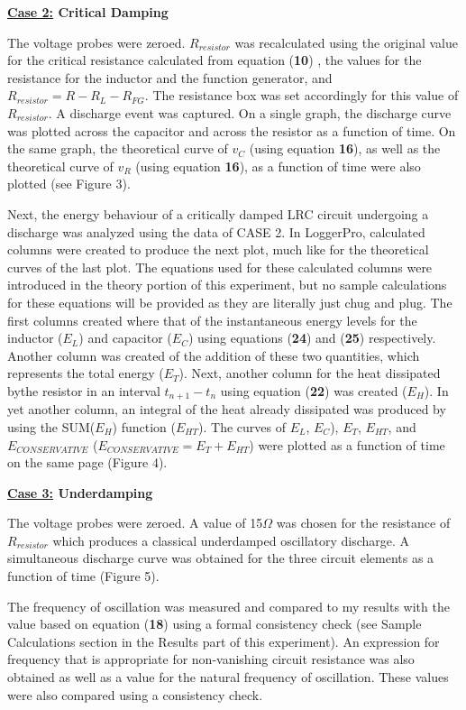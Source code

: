 \documentclass[twocolumn, letterpaper, 10pt, twoside]{article}
\begin{document}
      \textbf{\underline{Case 2:} Critical Damping}
      
      The voltage probes were zeroed. $R_{resistor}$ was recalculated using the original value for the critical resistance calculated from equation (\textbf{10}) , the values  for the resistance for the inductor and the function generator, and $R_{resistor} = R - R_L - R_{FG}$. The resistance box was set accordingly for this value of $R_{resistor}$. A discharge event was captured. On a single graph, the discharge curve was plotted across the capacitor and across the resistor as a function of time. On the same graph, the theoretical curve of $v_C$ (using equation \textbf{16}), as well as the theoretical curve of $v_R$ (using equation \textbf{16}), as a function of time were also plotted (see Figure 3). 
      
      Next, the energy behaviour of a critically damped LRC circuit  undergoing a discharge was analyzed using the data of CASE 2. In LoggerPro, calculated columns were created to produce the next plot, much like for the theoretical curves of the last plot. The equations used for these calculated columns were introduced in the theory portion of this experiment, but no sample calculations for these equations will be provided as they are literally just chug and plug. The first columns created where that of the instantaneous energy levels for the inductor ($E_L$) and capacitor ($E_C$) using equations (\textbf{24}) and (\textbf{25}) respectively. Another column was created of the addition of these two quantities, which represents the total energy ($E_T$). Next, another column for the heat dissipated bythe resistor in an interval $t_{n + 1} - t_n$ using equation (\textbf{22}) was created ($E_H$). In yet another column, an integral of the heat already dissipated was produced by using the SUM($E_H$) function ($E_{HT}$). The curves of $E_L$, $E_C$), $E_T$, $E_{HT}$, and $E_{CONSERVATIVE}$ ($E_{CONSERVATIVE} = E_T + E_{HT}$) were plotted as a function of time on the same page (Figure 4). 
      
       \textbf{\underline{Case 3:} Underdamping}
       
       The voltage probes were zeroed. A value of 15$\Omega$ was chosen for the resistance of $R_{resistor}$ which produces a classical underdamped oscillatory discharge. A simultaneous discharge curve was obtained for the three circuit elements as a function of time (Figure 5).  
       
       The frequency of oscillation was measured and compared to my results with the value based on equation (\textbf{18}) using a formal consistency check (see Sample Calculations section in the Results part of this experiment). An expression for frequency that is appropriate for non-vanishing circuit resistance was also obtained as well as a value for the natural frequency of oscillation. These values were also compared using a consistency check. 
       
\end{document}
